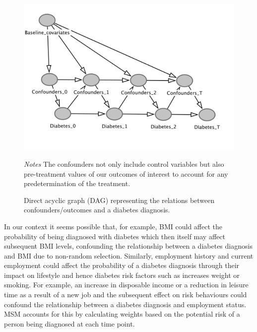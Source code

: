 \begin{figure}
\begin{center}
\caption{\label{fig:DAG} Direct acyclic graph (DAG) representing the relations between confounders/outcomes and a diabetes diagnosis.}
\includegraphics[scale=0.7]{Chapter5/Figures/dag}
\end{center}
\footnotesize{\textit{Notes} The confounders not only include control variables but also pre-treatment values of our outcomes of interest to account for any predetermination of the treatment.}

\end{figure}


In our context it seems possible that, for example, \ac{BMI} could affect the probability of being diagnosed with diabetes which then itself may affect subsequent \ac{BMI} levels, confounding the relationship between a diabetes diagnosis and \ac{BMI} due to non-random selection. Similarly, employment history and current employment could affect the probability of a diabetes diagnosis through their impact on lifestyle and hence diabetes risk factors such as increases weight or smoking. For example, an increase in disposable income or a reduction in leisure time as a result of a new job and the subsequent effect on risk behaviours could confound the relationship between a diabetes diagnosis and employment status. \ac{MSM} accounts for this by calculating weights based on the potential risk of a person being diagnosed at each time point. 

